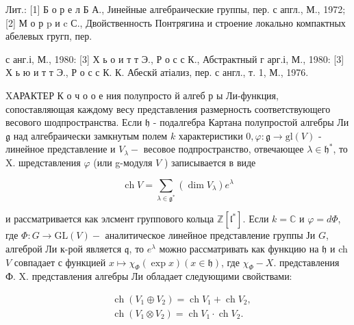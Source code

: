 \documentclass[10pt]{article}
\begin{document}
Лит.: [1] Б о р е л Б А., Јинейные алгебраические группы, пер. с апгл., М., 1972; [2] М о р p и c С., Двойственность Понтрягина и строение локально компактных абелевых гругп, пер.

с анг.і, М., 1980: [3] Х ь о и т т Э., Р о с с К., Абстрактный г арг.і, М., 1980: [3] Х ь ю и т т Э., Р о с с К. К. Абескй атіализ, пер. с англ., т. 1, М., 1976.



XАРАКТЕР К о ч о о е ния полупросто й алгеб р ы Ли-функция, сопоставляющая каждому весу представления размерность соответствующего весового шодпространства. Если $\mathfrak{h}$ - подалгебра Картана полупростой алгебры Ли $\mathfrak{g}$ над алгебраически замкнутым полем $k$ характеристики $0, \varphi: \mathfrak{g} \longrightarrow \mathrm{gl}(V)$ - линейное представление и $V_{\lambda}-$ весовое подпространство, отвечающее $\lambda \in \mathfrak{h}^{*}$, то X. шредставления $\varphi$ (или g-модуля $V$ ) записывается в виде



\[

\operatorname{ch} V=\sum_{\lambda \in \mathfrak{g}^{*}}\left(\operatorname{dim} V_{\lambda}\right) e^{\lambda}

\]



и рассматривается как элсмент группового кольца $\mathbb{Z}\left[\mathfrak{l}^{*}\right]$. Если $k=\mathbb{C}$ и $\varphi=d \Phi$, где $\Phi: G \longrightarrow \mathrm{GL}(V)-$ аналитическое линейное представление группы Ји $G$, алгеброй Ли к-рой является $\mathfrak{q}$, то $e^{\lambda}$ можно рассматривать как функцию на $\mathfrak{h}$ и ch $V$ совпадает с функцией $x \longmapsto \chi_{\Phi}(\exp x)(x \in \mathfrak{h})$, где $\chi_{\Phi}-X$. представления Ф. X. представления алгебры Ли обладает следующими свойствами:



\[

\begin{aligned}

& \operatorname{ch}\left(V_{1} \oplus V_{2}\right)=\operatorname{ch} V_{1}+\operatorname{ch} V_{2}, \\

& \operatorname{ch}\left(V_{1} \otimes V_{2}\right)=\operatorname{ch} V_{1} \cdot \operatorname{ch} V_{2} .

\end{aligned}

\]
\end{document}
